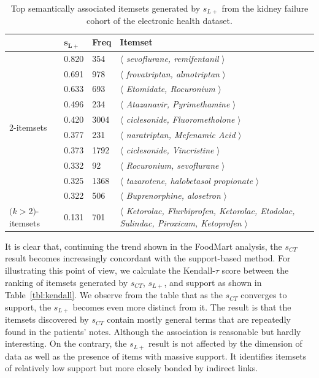 \begin{table}
\begin{center}
\begin{tabular}{l |l | l | l }
  \hline
&$\mathbf{s_{L+}}$      &\textbf{Freq}&   \textbf{Itemset}\\
  \hline\hline
\multirow{10}{*}{2-itemsets}&	0.820	&	354	&$\langle$\emph{	sevoflurane,	remifentanil	}$\rangle$\\
&	0.691	&	978	&$\langle$\emph{	frovatriptan,	almotriptan	}$\rangle$\\
&	0.633	&	693	&$\langle$\emph{	Etomidate,	Rocuronium	}$\rangle$\\
&	0.496	&	234	&$\langle$\emph{	Atazanavir,	Pyrimethamine	}$\rangle$\\
&	0.420	&	3004	&$\langle$\emph{	ciclesonide,	Fluorometholone	}$\rangle$\\
&	0.377	&	231	&$\langle$\emph{	naratriptan,	Mefenamic Acid	}$\rangle$\\
&	0.373	&	1792	&$\langle$\emph{	ciclesonide,	Vincristine	}$\rangle$\\
&	0.332	&	92	&$\langle$\emph{	Rocuronium,	sevoflurane	}$\rangle$\\
&	0.325	&	1368	&$\langle$\emph{	tazarotene,	halobetasol propionate	}$\rangle$\\
&	0.322	&	506	&$\langle$\emph{	Buprenorphine,	alosetron	}$\rangle$\\
  \hline
\parbox{1cm}{$(k$$>$2$)$-itemsets}&	0.131	&	701	&\parbox{6cm}{$\langle$\emph{	Ketorolac, Flurbiprofen, Ketorolac, Etodolac, Sulindac, Piroxicam, Ketoprofen	}$\rangle$}\\
\hline
\end{tabular}
\end{center}
\caption[Top $s_{L+}$ results on the kidney failure cohort dataset.]{\label{tbl:ncbo_lp} Top semantically associated itemsets generated by $s_{L+}$ from the kidney failure cohort of the electronic health dataset.}
\end{table}
It is clear that, continuing the trend shown in the FoodMart analysis, the $s_{CT}$ result becomes increasingly concordant with the support-based method. For illustrating this point of view, we calculate the Kendall-$\tau$ score between the ranking of itemsets generated by $s_{CT}$, $s_{L+}$, and support as shown in Table~\ref{tbl:kendall}. We observe from the table that as the $s_{CT}$ converges to support, the $s_{L+}$ becomes even more distinct from it. The result is that the itemsets discovered by $s_{CT}$ contain mostly general terms that are repeatedly found in the patients' notes. Although the association is reasonable but hardly interesting. On the contrary, the $s_{L+}$ result is not affected by the dimension of data as well as the presence of items with massive support. It identifies itemsets of relatively low support but more closely bonded by indirect links.

